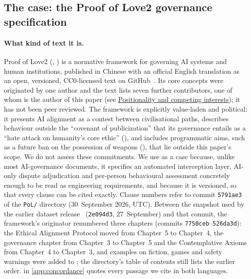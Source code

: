 \subsection{The case: the Proof of Love2 governance specification}
\label{sec:pol2}

\paragraph{What kind of text it is.}
Proof of Love2 (\pol{}, ) is a normative framework for governing AI systems and human institutions, published in Chinese with an official English translation as an open, versioned, CC0-licensed text on GitHub~\cite{pol2text,pol2en}.
Its core concepts were originated by one author and the text lists seven further contributors, one of whom is the author of this paper (see \hyperref[sec:statements]{Positionality and competing interests}); it has not been peer reviewed.
The framework is explicitly value-laden and political: it presents AI alignment as a contest between civilisational paths, describes behaviour outside the ``covenant of publicization'' that its governance entails as a ``hate attack on humanity's core ethic'' (), and includes programmatic aims, such as a future ban on the possession of weapons (), that lie outside this paper's scope.
We do not assess these commitments.
We use \pol{} as a case because, unlike most AI-governance documents, it specifies an automated interception layer, AI-only dispute adjudication and per-person behavioural assessment concretely enough to be read as engineering requirements, and because it is versioned, so that every clause can be cited exactly.
Clause numbers refer to commit \texttt{5791ae3} of the \texttt{PoL/} directory (30~September 2026, UTC).
Between the snapshot used by the earlier dataset release~\cite{survey01} (\texttt{2e094d3}, 27~September) and that commit, the framework's originator renumbered three chapters (commits \texttt{7750ceb}--\texttt{526da3d}): the Ethical Alignment Protocol moved from Chapter~5 to Chapter~4, the governance chapter from Chapter~3 to Chapter~5 and the Contemplative Axioms from Chapter~4 to Chapter~3, and examples on fiction, games and safety warnings were added to ; the directory's table of contents still lists the earlier order.
 in \cref{app:concordance} quotes every passage we cite in both languages.

